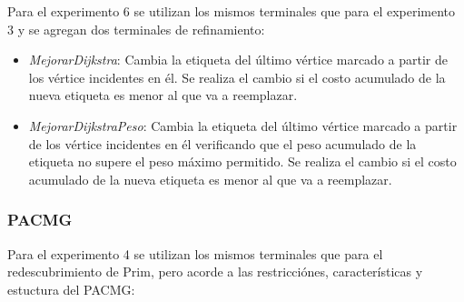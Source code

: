 Para el experimento 6 se utilizan los mismos terminales que para el experimento 3 y se agregan dos terminales de refinamiento:

\begin{itemize}

\item \textit{MejorarDijkstra}: Cambia la etiqueta del último vértice marcado a partir de los vértice incidentes en él. Se realiza el cambio si el costo acumulado de la nueva etiqueta es menor al que va a reemplazar.

\item \textit{MejorarDijkstraPeso}: Cambia la etiqueta del último vértice marcado a partir de los vértice incidentes en él verificando que el peso acumulado de la etiqueta no supere el peso máximo permitido. Se realiza el cambio si el costo acumulado de la nueva etiqueta es menor al que va a reemplazar.

\end{itemize}

\subsubsection*{PACMG}

Para el experimento 4 se utilizan los mismos terminales que para el redescubrimiento de Prim, pero acorde a las restricciónes, características y estuctura del PACMG:

